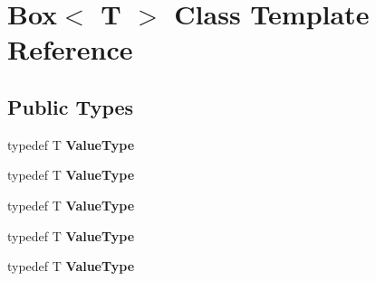 \hypertarget{class_box}{
\section{Box$<$ T $>$ Class Template Reference}
\label{class_box}
}
\subsection*{Public Types}
\begin{DoxyCompactItemize}
\item 
\hypertarget{class_box_a05603487d4b2a3b1186ed8d3dd6914b7}{
typedef T {\bfseries ValueType}}
\label{class_box_a05603487d4b2a3b1186ed8d3dd6914b7}

\item 
\hypertarget{class_box_a05603487d4b2a3b1186ed8d3dd6914b7}{
typedef T {\bfseries ValueType}}
\label{class_box_a05603487d4b2a3b1186ed8d3dd6914b7}

\item 
\hypertarget{class_box_a05603487d4b2a3b1186ed8d3dd6914b7}{
typedef T {\bfseries ValueType}}
\label{class_box_a05603487d4b2a3b1186ed8d3dd6914b7}

\item 
\hypertarget{class_box_a05603487d4b2a3b1186ed8d3dd6914b7}{
typedef T {\bfseries ValueType}}
\label{class_box_a05603487d4b2a3b1186ed8d3dd6914b7}

\item 
\hypertarget{class_box_a05603487d4b2a3b1186ed8d3dd6914b7}{
typedef T {\bfseries ValueType}}
\label{class_box_a05603487d4b2a3b1186ed8d3dd6914b7}

\end{DoxyCompactItemize}
